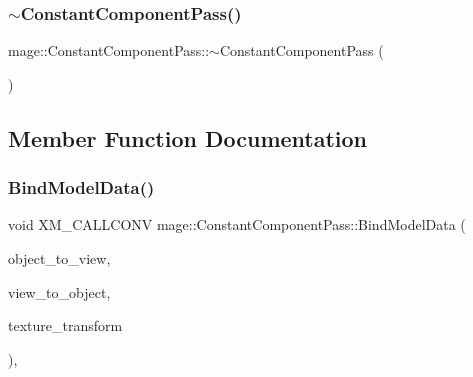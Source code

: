 \hypertarget{classmage_1_1_constant_component_pass_aaa94607b422672dab4cb77f129382d1b}{}\label{classmage_1_1_constant_component_pass_aaa94607b422672dab4cb77f129382d1b} 
\subsubsection{\texorpdfstring{$\sim$\+Constant\+Component\+Pass()}{~ConstantComponentPass()}}
{\footnotesize\ttfamily mage\+::\+Constant\+Component\+Pass\+::$\sim$\+Constant\+Component\+Pass (\begin{DoxyParamCaption}{ }\end{DoxyParamCaption})\hspace{0.3cm}{\ttfamily [default]}}



\subsection{Member Function Documentation}
\hypertarget{classmage_1_1_constant_component_pass_a91ac4ce9a2d4878d022b7e0aec7f9d06}{}\label{classmage_1_1_constant_component_pass_a91ac4ce9a2d4878d022b7e0aec7f9d06} 
\subsubsection{\texorpdfstring{Bind\+Model\+Data()}{BindModelData()}}
{\footnotesize\ttfamily void X\+M\+\_\+\+C\+A\+L\+L\+C\+O\+NV mage\+::\+Constant\+Component\+Pass\+::\+Bind\+Model\+Data (\begin{DoxyParamCaption}\item[{F\+X\+M\+M\+A\+T\+R\+IX}]{object\+\_\+to\+\_\+view,  }\item[{F\+X\+M\+M\+A\+T\+R\+IX}]{view\+\_\+to\+\_\+object,  }\item[{F\+X\+M\+M\+A\+T\+R\+IX}]{texture\+\_\+transform }\end{DoxyParamCaption})\hspace{0.3cm}{\ttfamily [private]}, {\ttfamily [noexcept]}}

